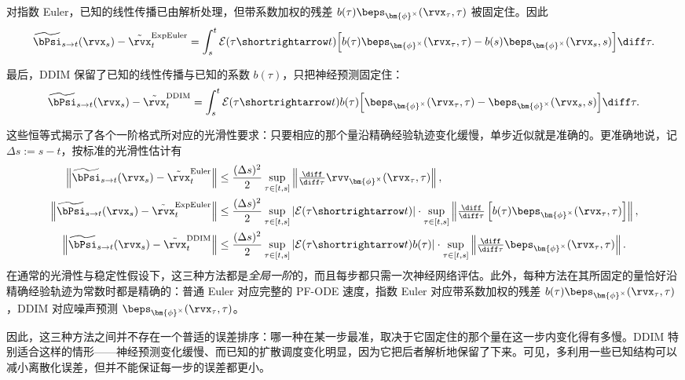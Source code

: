 对指数 Euler，已知的线性传播已由解析处理，但带系数加权的残差 $b(\tau)\beps_{\bm{\phi}^\times}(\rvx_\tau,\tau)$ 被固定住。因此
\begin{align*}
\widetilde\bPsi_{s\to t}(\rvx_s)
-
\tilde\rvx_t^{\mathrm{ExpEuler}}
=
\int_s^t
\mathcal E(\tau\shortrightarrow t)
\Big[
b(\tau)
\beps_{\bm{\phi}^\times}(\rvx_\tau,\tau)
-
b(s)
\beps_{\bm{\phi}^\times}(\rvx_s,s)
\Big]
\diff\tau.
\end{align*}

最后，DDIM 保留了已知的线性传播与已知的系数 $b(\tau)$，只把神经预测固定住：
\begin{align}
\label{eq:ddim-local-defect}
\widetilde\bPsi_{s\to t}(\rvx_s)
-
\tilde\rvx_t^{\mathrm{DDIM}}
=
\int_s^t
\mathcal E(\tau\shortrightarrow t)b(\tau)
\Big[
\beps_{\bm{\phi}^\times}(\rvx_\tau,\tau)
-
\beps_{\bm{\phi}^\times}(\rvx_s,s)
\Big]
\diff\tau.
\end{align}

这些恒等式揭示了各个一阶格式所对应的光滑性要求：只要相应的那个量沿精确经验轨迹变化缓慢，单步近似就是准确的。更准确地说，记 $\Delta s:=s-t$，按标准的光滑性估计有
\begin{align*}
\left\|
\widetilde\bPsi_{s\to t}(\rvx_s)
-
\tilde\rvx_t^{\mathrm{Euler}}
\right\|
&\le
\frac{(\Delta s)^2}{2}
\sup_{\tau\in[t,s]}
\left\|
\tfrac{\diff}{\diff\tau}
\rvv_{\bm{\phi}^\times}(\rvx_\tau,\tau)
\right\|,
\\
\left\|
\widetilde\bPsi_{s\to t}(\rvx_s)
-
\tilde\rvx_t^{\mathrm{ExpEuler}}
\right\|
&\le
\frac{(\Delta s)^2}{2}
\sup_{\tau\in[t,s]}
\left|
\mathcal E(\tau\shortrightarrow t)
\right|\cdot
\sup_{\tau\in[t,s]}
\left\|
\tfrac{\diff}{\diff\tau}
\left[
b(\tau)
\beps_{\bm{\phi}^\times}(\rvx_\tau,\tau)
\right]
\right\|,
\\
\left\|
\widetilde\bPsi_{s\to t}(\rvx_s)
-
\tilde\rvx_t^{\mathrm{DDIM}}
\right\|
&\le
\frac{(\Delta s)^2}{2}
\sup_{\tau\in[t,s]}
\left|
\mathcal E(\tau\shortrightarrow t)b(\tau)
\right| \cdot
\sup_{\tau\in[t,s]}
\left\|
\tfrac{\diff}{\diff\tau}
\beps_{\bm{\phi}^\times}(\rvx_\tau,\tau)
\right\|.
\end{align*}
在通常的光滑性与稳定性假设下，这三种方法都是\emph{全局一阶}的，而且每步都只需一次神经网络评估。此外，每种方法在其所固定的量恰好沿精确经验轨迹为常数时都是精确的：普通 Euler 对应完整的 PF-ODE 速度，指数 Euler 对应带系数加权的残差 $b(\tau)\beps_{\bm{\phi}^\times}(\rvx_\tau,\tau)$，DDIM 对应噪声预测 $\beps_{\bm{\phi}^\times}(\rvx_\tau,\tau)$。

因此，这三种方法之间并不存在一个普适的误差排序：哪一种在某一步最准，取决于它固定住的那个量在这一步内变化得有多慢。DDIM 特别适合这样的情形——神经预测变化缓慢、而已知的扩散调度变化明显，因为它把后者解析地保留了下来。可见，多利用一些已知结构可以减小离散化误差，但并不能保证每一步的误差都更小。

